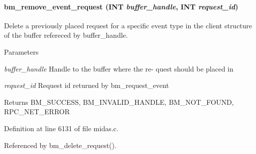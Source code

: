 \paragraph[{bm\_\-remove\_\-event\_\-request}]{ bm\_\-remove\_\-event\_\-request ({\bf INT} {\em buffer\_\-handle}, \/  {\bf INT} {\em request\_\-id})}\hfill\label{group__bmfunctionc_ga7810d29ac3894a4e299737bc7c7a2cf1}
Delete a previously placed request for a specific event type in the client structure of the buffer refereced by buffer\_\-handle. 
\begin{DoxyParams}{Parameters}
\item[{\em buffer\_\-handle}]Handle to the buffer where the re-\/ quest should be placed in \item[{\em request\_\-id}]Request id returned by bm\_\-request\_\-event \end{DoxyParams}
\begin{DoxyReturn}{Returns}
BM\_\-SUCCESS, BM\_\-INVALID\_\-HANDLE, BM\_\-NOT\_\-FOUND, RPC\_\-NET\_\-ERROR 
\end{DoxyReturn}


Definition at line 6131 of file midas.c.

Referenced by bm\_\-delete\_\-request().
